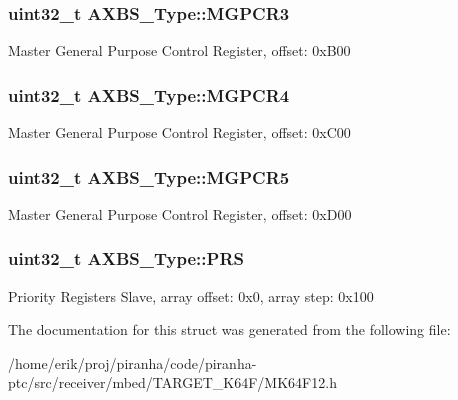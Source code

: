 \subsubsection[{\texorpdfstring{M\+G\+P\+C\+R3}{MGPCR3}}]{ uint32\+\_\+t A\+X\+B\+S\+\_\+\+Type\+::\+M\+G\+P\+C\+R3}\hypertarget{structAXBS__Type_ae9e660e16d928563b9b2e58f46983504}{}\label{structAXBS__Type_ae9e660e16d928563b9b2e58f46983504}
Master General Purpose Control Register, offset\+: 0x\+B00 
\subsubsection[{\texorpdfstring{M\+G\+P\+C\+R4}{MGPCR4}}]{ uint32\+\_\+t A\+X\+B\+S\+\_\+\+Type\+::\+M\+G\+P\+C\+R4}\hypertarget{structAXBS__Type_aaa542cd213d68e28cb53b109ad72d3f8}{}\label{structAXBS__Type_aaa542cd213d68e28cb53b109ad72d3f8}
Master General Purpose Control Register, offset\+: 0x\+C00 
\subsubsection[{\texorpdfstring{M\+G\+P\+C\+R5}{MGPCR5}}]{ uint32\+\_\+t A\+X\+B\+S\+\_\+\+Type\+::\+M\+G\+P\+C\+R5}\hypertarget{structAXBS__Type_a2b43d3f715876c1d8a5297f9f401df13}{}\label{structAXBS__Type_a2b43d3f715876c1d8a5297f9f401df13}
Master General Purpose Control Register, offset\+: 0x\+D00 
\subsubsection[{\texorpdfstring{P\+RS}{PRS}}]{ uint32\+\_\+t A\+X\+B\+S\+\_\+\+Type\+::\+P\+RS}\hypertarget{structAXBS__Type_a5fcaf70cb286f5b3bb78e2ba616586c1}{}\label{structAXBS__Type_a5fcaf70cb286f5b3bb78e2ba616586c1}
Priority Registers Slave, array offset\+: 0x0, array step\+: 0x100 

The documentation for this struct was generated from the following file\+:\begin{DoxyCompactItemize}
\item 
/home/erik/proj/piranha/code/piranha-\/ptc/src/receiver/mbed/\+T\+A\+R\+G\+E\+T\+\_\+\+K64\+F/M\+K64\+F12.\+h\end{DoxyCompactItemize}
